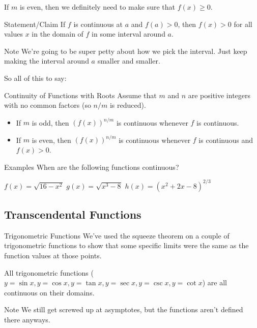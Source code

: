 If $m$ is even, then we definitely need to make sure that $f(x)\geq 0$.

\begin{thm}{Statement/Claim}
  If $f$ is continuous at $a$ and $f(a)>0$, then $f(x)>0$ for all values $x$ in the domain of $f$ in some interval around $a$.
\end{thm}

\begin{note}{Note}
  We're going to be super petty about how we pick the interval.
  Just keep making the interval around $a$ smaller and smaller.
\end{note}

So all of this to say:

\begin{thm}{Continuity of Functions with Roots}
  Assume that $m$ and $n$ are positive integers with no common factors (so $n/m$ is reduced).
  \begin{itemize}
    \item If $m$ is odd, then $(f(x))^{n/m}$ is continuous whenever $f$ is continuous.
    \item If $m$ is even, then $(f(x))^{n/m}$ is continuous whenever $f$ is continuous and $f(x)>0$.
  \end{itemize}
\end{thm}

\begin{note}{Examples}
  When are the following functions continuous?

  $f(x)=\sqrt{16-x^2}$ \quad $g(x) = \sqrt{x^3-8}$ \quad $h(x) = (x^2+2x-8)^{2/3}$
\end{note}

\subsection*{Transcendental Functions}

\begin{defn}{Trigonometric Functions}
  We've used the squeeze theorem on a couple of trigonometric functions to show that some specific limits were the same as the function values at those points.

  All trigonometric functions ($y=\sin x, y=\cos x, y=\tan x, y=\sec x, y=\csc x, y=\cot x$) are all continuous on their domains.
  \begin{note}{Note}
    We still get screwed up at asymptotes, but the functions aren't defined there anyways.
  \end{note}
\end{defn}

